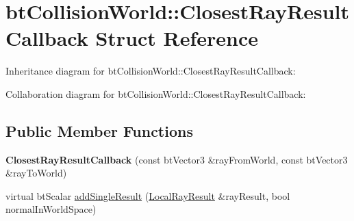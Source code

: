 \hypertarget{structbt_collision_world_1_1_closest_ray_result_callback}{\section{bt\+Collision\+World\+:\+:Closest\+Ray\+Result\+Callback Struct Reference}
\label{structbt_collision_world_1_1_closest_ray_result_callback}
}


Inheritance diagram for bt\+Collision\+World\+:\+:Closest\+Ray\+Result\+Callback\+:


Collaboration diagram for bt\+Collision\+World\+:\+:Closest\+Ray\+Result\+Callback\+:
\subsection*{Public Member Functions}
\begin{DoxyCompactItemize}
\item 
\hypertarget{structbt_collision_world_1_1_closest_ray_result_callback_a63c270257d511fc2404dc3117a09151b}{{\bfseries Closest\+Ray\+Result\+Callback} (const bt\+Vector3 \&ray\+From\+World, const bt\+Vector3 \&ray\+To\+World)}\label{structbt_collision_world_1_1_closest_ray_result_callback_a63c270257d511fc2404dc3117a09151b}

\item 
virtual bt\+Scalar \hyperlink{structbt_collision_world_1_1_closest_ray_result_callback_a36afc6c41a6f7576a9b6d23771cf8fc4}{add\+Single\+Result} (\hyperlink{structbt_collision_world_1_1_local_ray_result}{Local\+Ray\+Result} \&ray\+Result, bool normal\+In\+World\+Space)
\end{DoxyCompactItemize}
